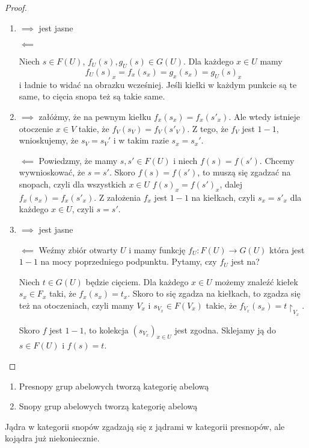 \begin{proof}
  \begin{enumerate}
    \item $\implies$ jest jasne

      $\impliedby$

      Niech $s\in F(U)$, $f_U(s), g_U(s)\in G(U)$. Dla każdego $x\in U$ mamy 
      $$f_U(s)_x=f_x(s_x)=g_x(s_x)=g_U(s)_x$$
      i ładnie to widać na obrazku wcześniej. Jeśli kiełki w każdym punkcie są te same, to cięcia snopa też są takie same.

    \item $\implies$ załóżmy, że na pewnym kiełku $f_x(s_x)=f_x(s'_x)$. Ale wtedy istnieje otoczenie $x\in V$ takie, że $f_V(s_V)=f_V(s'_V)$. Z tego, że $f_V$ jest $1-1$, wnioskujemy, że $s_V=s_V'$ i w takim razie $s_x=s_x'$.

      $\impliedby$ Powiedzmy, że mamy $s, s'\in F(U)$ i niech $f(s)=f(s')$. Chcemy wywnioskować, że $s=s'$. Skoro $f(s)=f(s')$, to muszą się zgadzać na snopach, czyli dla wszystkich $x\in U$ $f(s)_x=f(s')_x$, dalej $f_x(s_x)=f_x(s'_x)$. Z założenia $f_x$ jest $1-1$ na kiełkach, czyli $s_x=s'_x$ dla każdego $x\in U$, czyli $s=s'$.

    \item $\implies$ jest jasne

      $\impliedby$ Weźmy zbiór otwarty $U$ i mamy funkcję $f_U:F(U)\to G(U)$ która jest $1-1$ na mocy poprzedniego podpunktu. Pytamy, czy $f_U$ jest na?

      Niech $t\in G(U)$ będzie cięciem. Dla każdego $x\in U$ możemy znaleźć kiełek $s_x\in F_x$ taki, że $f_x(s_x)=t_x$. Skoro to się zgadza na kiełkach, to zgadza się też na otoczeniach, czyli mamy $V_x$ i $s_{V_x}\in F(V_x)$ takie, że $f_{V_x}(s_x)=t\restriction_{V_x}$.

      Skoro $f$ jest $1-1$, to kolekcja $(s_{V_x})_{x\in U}$ jest zgodna. Sklejamy ją do $s\in F(U)$ i $f(s)=t$.
  \end{enumerate}
\end{proof}

\begin{fact}
  \begin{enumerate}
    \item Presnopy grup abelowych tworzą kategorię abelową
    \item Snopy grup abelowych tworzą kategorię abelową
  \end{enumerate}
\end{fact}

Jądra w kategorii snopów zgadzają się z jądrami w kategorii presnopów, ale kojądra już niekoniecznie.

